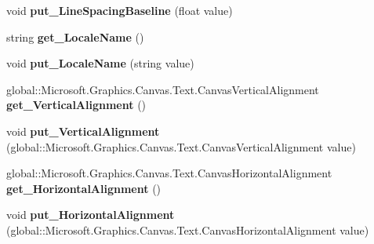 \begin{DoxyCompactItemize}
void {\bfseries put\+\_\+\+Line\+Spacing\+Baseline} (float value)
\item 
\mbox{\label{class_microsoft_1_1_graphics_1_1_canvas_1_1_text_1_1_canvas_text_format_aab1272a9576fbc301b6645b050fc4938}} 
string {\bfseries get\+\_\+\+Locale\+Name} ()
\item 
\mbox{\label{class_microsoft_1_1_graphics_1_1_canvas_1_1_text_1_1_canvas_text_format_ad8facd01f087e75c6d8dde3e81ac836f}} 
void {\bfseries put\+\_\+\+Locale\+Name} (string value)
\item 
\mbox{\label{class_microsoft_1_1_graphics_1_1_canvas_1_1_text_1_1_canvas_text_format_a4400b8ea39646d7a48f76a32e6197d12}} 
global\+::\+Microsoft.\+Graphics.\+Canvas.\+Text.\+Canvas\+Vertical\+Alignment {\bfseries get\+\_\+\+Vertical\+Alignment} ()
\item 
\mbox{\label{class_microsoft_1_1_graphics_1_1_canvas_1_1_text_1_1_canvas_text_format_ad8c32a1802c2930e9a41b312f03881b1}} 
void {\bfseries put\+\_\+\+Vertical\+Alignment} (global\+::\+Microsoft.\+Graphics.\+Canvas.\+Text.\+Canvas\+Vertical\+Alignment value)
\item 
\mbox{\label{class_microsoft_1_1_graphics_1_1_canvas_1_1_text_1_1_canvas_text_format_aada5eeeefb336038b13a36fa1c2eafda}} 
global\+::\+Microsoft.\+Graphics.\+Canvas.\+Text.\+Canvas\+Horizontal\+Alignment {\bfseries get\+\_\+\+Horizontal\+Alignment} ()
\item 
\mbox{\label{class_microsoft_1_1_graphics_1_1_canvas_1_1_text_1_1_canvas_text_format_a41dba6b94d37a3688961e2aaf678a2e6}} 
void {\bfseries put\+\_\+\+Horizontal\+Alignment} (global\+::\+Microsoft.\+Graphics.\+Canvas.\+Text.\+Canvas\+Horizontal\+Alignment value)
\item 
\mbox{\label{class_microsoft_1_1_graphics_1_1_canvas_1_1_text_1_1_canvas_text_format_ae84dccbd2abc45d77d283e369c1d8033}} 

\end{DoxyCompactItemize}
